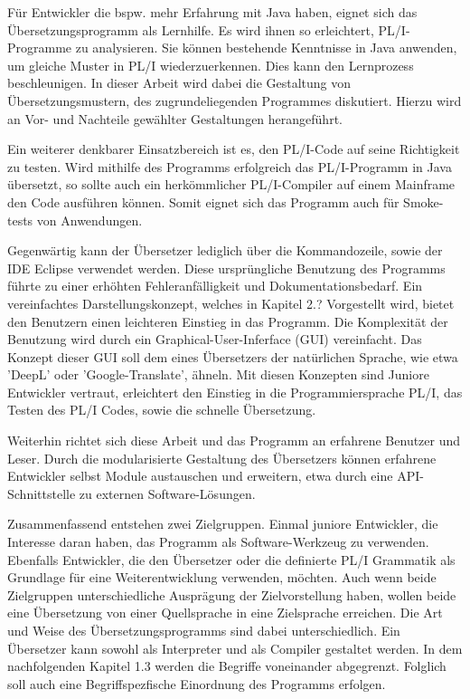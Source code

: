 Für Entwickler die bspw. mehr Erfahrung mit Java haben, eignet sich das Übersetzungsprogramm als Lernhilfe. Es wird ihnen so erleichtert, PL/I-Programme zu analysieren. Sie können bestehende Kenntnisse in Java anwenden, um gleiche Muster in PL/I wiederzuerkennen. Dies kann den Lernprozess beschleunigen. In dieser Arbeit wird dabei die Gestaltung von Übersetzungsmustern, des zugrundeliegenden Programmes diskutiert. Hierzu wird an Vor- und Nachteile gewählter Gestaltungen herangeführt.

Ein weiterer denkbarer Einsatzbereich ist es, den PL/I-Code auf seine Richtigkeit zu testen. Wird mithilfe des Programms erfolgreich das PL/I-Programm in Java übersetzt, so sollte auch ein herkömmlicher PL/I-Compiler auf einem Mainframe den Code ausführen können. Somit eignet sich das Programm auch für Smoke-tests von Anwendungen.

Gegenwärtig kann der Übersetzer lediglich über die Kommandozeile, sowie der IDE Eclipse verwendet werden. Diese ursprüngliche Benutzung des Programms führte zu einer erhöhten Fehleranfälligkeit und Dokumentationsbedarf. Ein vereinfachtes Darstellungskonzept, welches in Kapitel 2.? Vorgestellt wird, bietet den Benutzern einen leichteren Einstieg in das Programm.
Die Komplexität der Benutzung wird durch ein Graphical-User-Inferface (GUI) vereinfacht. Das Konzept dieser GUI soll dem eines Übersetzers der natürlichen Sprache, wie etwa 'DeepL' oder 'Google-Translate', ähneln. Mit diesen Konzepten sind Juniore Entwickler vertraut, erleichtert den Einstieg in die Programmiersprache PL/I, das Testen des PL/I Codes, sowie die schnelle Übersetzung.

Weiterhin richtet sich diese Arbeit und das Programm an erfahrene Benutzer und Leser. Durch die modularisierte Gestaltung des Übersetzers können erfahrene Entwickler selbst Module austauschen und erweitern, etwa durch eine API-Schnittstelle zu externen Software-Lösungen.

Zusammenfassend entstehen zwei Zielgruppen. Einmal juniore Entwickler, die Interesse daran haben, das Programm als Software-Werkzeug zu verwenden. Ebenfalls Entwickler, die den Übersetzer oder die definierte PL/I Grammatik als Grundlage für eine Weiterentwicklung verwenden, möchten. 
Auch wenn beide Zielgruppen unterschiedliche Ausprägung der Zielvorstellung haben, wollen beide eine Übersetzung von einer Quellsprache in eine Zielsprache erreichen. Die Art und Weise des Übersetzungsprogramms sind dabei unterschiedlich. Ein Übersetzer kann sowohl als Interpreter und als Compiler gestaltet werden. In dem nachfolgenden Kapitel 1.3 werden die Begriffe voneinander abgegrenzt. Folglich soll auch eine Begriffspezfische Einordnung des Programms erfolgen.
	
